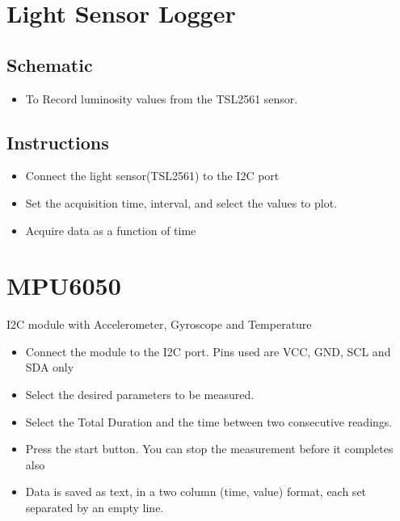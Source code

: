 \documentclass[a4paper,12pt,english]{sphinxmanual}
\let\sphinxpxdimen\pdfpxdimen\else\newdimen\sphinxpxdimen
\begin{document}
\section{Light Sensor Logger}
\label{\detokenize{6.91:light-sensor-logger}}\label{\detokenize{6.91::doc}}

\subsection{Schematic}
\label{\detokenize{6.91:schematic}}\begin{itemize}
\item {} 
To Record luminosity values from the TSL2561 sensor.

\end{itemize}


\subsection{Instructions}
\label{\detokenize{6.91:instructions}}\begin{itemize}
\item {} 
Connect the light sensor(TSL2561) to the I2C port

\item {} 
Set the acquisition time, interval, and select the values to plot.

\item {} 
Acquire data as a function of time

\end{itemize}


\section{MPU6050}
\label{\detokenize{6.92:mpu6050}}\label{\detokenize{6.92::doc}}
\noindent\sphinxincludegraphics[width=300\sphinxpxdimen]{{MPU6050}.pdf}

I2C module with Accelerometer, Gyroscope and Temperature
\begin{itemize}
\item {} 
Connect the module to the I2C port. Pins used are VCC, GND, SCL and SDA only

\item {} 
Select the desired parameters to be measured.

\item {} 
Select the Total Duration and the time between two consecutive readings.

\item {} 
Press the start button. You can stop the measurement before it completes also

\item {} 
Data is saved as text, in a two column (time, value) format, each set separated by an empty line.

\end{itemize}
\end{document}
